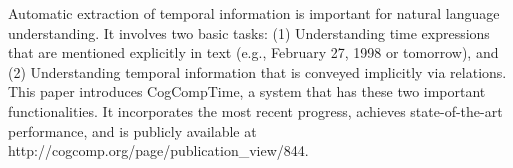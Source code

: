 Automatic extraction of temporal information is important for natural language understanding. It involves two basic tasks: (1) Understanding time expressions that are mentioned explicitly in text (e.g., February 27, 1998 or tomorrow), and (2) Understanding temporal information that is conveyed implicitly via relations. This paper introduces CogCompTime, a system that has these two important functionalities. It incorporates the most recent progress, achieves state-of-the-art performance, and is publicly available at http://cogcomp.org/page/publication\_view/844.

